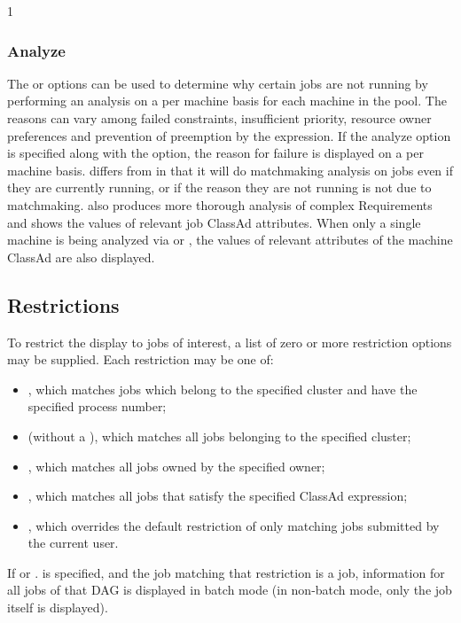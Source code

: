 \begin{ManPage}{\label{man-condor-q}}{1}
\subsubsection*{Analyze}
The  or  options can be used to determine 
why certain jobs are not
running by performing an analysis on a per machine basis for each machine in 
the pool.  The reasons can vary among failed constraints, insufficient priority,
resource owner preferences and prevention of preemption by the 
 expression.  
If the analyze option  is specified 
along with the  option, the reason for failure is displayed on a 
per machine basis. 
 differs from  in that it will
do matchmaking analysis on jobs even if they are currently running, 
or if the reason they are not running is not due to matchmaking.
 also produces
more thorough analysis of complex Requirements and shows the values of 
relevant job ClassAd attributes.  
When only a single machine is being analyzed via  or
,
the values of relevant attributes of the machine ClassAd are also displayed.

\subsection*{Restrictions}
To restrict the display to jobs of interest, a list of zero or more 
restriction options may be supplied.  Each restriction may be one of:
\begin{itemize}
	\item {}, which matches jobs which
		belong to the specified cluster and have the specified process number;
	\item {} (without a ), which matches all jobs belonging
		to the specified cluster;
	\item {}, which matches all jobs owned by the specified owner;
	\item {}, which matches all jobs that
		satisfy the specified ClassAd expression;
	\item {}, which overrides the default
		restriction of only matching jobs submitted by the
		current user.
\end{itemize}

If  or . is specified, and
the job matching that restriction is a  job, information
for all jobs of that DAG is displayed in batch mode (in non-batch
mode, only the  job itself is displayed).


\end{ManPage}
